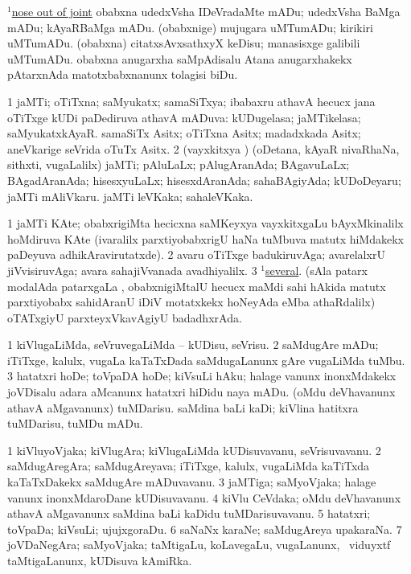 \noindent
\gl{\nuga}
\bmng
{} \hyperref{kandict_n.pdf}{N}{nose(1) pagu(21)}{$^1$nose out of joint} 
\banum
{} obabxna udedxVsha IDeVradaMte mADu; udedxVsha BaMga mADu; kAyaRBaMga mADu. 
 (obabxnige) mujugara uMTumADu; kirikiri uMTumADu. 
 (obabxna) citatxsAvxsathxyX keDisu; manasisxge galibili uMTumADu. 
 obabxna anugarxha saMpAdisalu Atana anugarxhakekx pAtarxnAda matotxbabxnanunx tolagisi biDu. 
\eanum
\emng
\eentry

\bentry
{}
\gl{\gu}
\bmng
\bnum
\num{1} jaMTi; oTiTxna; saMyukatx; samaSiTxya; ibabaxru athavA hecucx jana oTiTxge kUDi paDediruva athavA mADuva:   kUDugelasa; jaMTikelasa; saMyukatxkAyaR.   samaSiTx Asitx; oTiTxna Asitx; madadxkada Asitx; aneVkarige seVrida oTuTx Asitx. 
\num{2} (vayxkitxya \vi) (oDetana, kAyaR nivaRhaNa, sithxti, \mo vugaLalilx) jaMTi; pAluLaLx; pAlugAranAda; BAgavuLaLx; BAgadAranAda; hisesxyuLaLx; hisesxdAranAda; sahaBAgiyAda;   kUDoDeyaru; jaMTi mAliVkaru.   jaMTi leVKaka; sahaleVKaka. 
\enum
\emng

\noindent
\gl{\pagu}
\bmng
\bnum
\num{1}   jaMTi KAte; obabxrigiMta hecicxna saMKeyxya vayxkitxgaLu bAyxMkinalilx hoMdiruva KAte (ivaralilx parxtiyobabxrigU haNa tuMbuva matutx hiMdakekx paDeyuva adhikAravirutatxde). 
\num{2}    avaru oTiTxge badukiruvAga; avarelalxrU jiVvisiruvAga; avara sahajiVvanada avadhiyalilx. 
\num{3}  \hyperref{kandict_s.pdf}{S}{several(1) pagu(2)}{$^1$several}. (sAla patarx modalAda patarxgaLa \vi, obabxnigiMtalU hecucx maMdi sahi hAkida matutx parxtiyobabx sahidAranU iDiV motatxkekx hoNeyAda eMba athaRdalilx) oTATxgiyU parxteyxVkavAgiyU badadhxrAda. 
\enum
\emng
\eentry

\bentry
{}
\gl{\sakirx}
\bmng
\bnum
\num{1} kiVlugaLiMda, seVruvegaLiMda -- kUDisu, seVrisu. 
\num{2} saMdugAre mADu; iTiTxge, kalulx, \mo vugaLa kaTaTxDada saMdugaLanunx gAre \mo vugaLiMda tuMbu. 
\num{3} hatatxri hoDe; toVpaDA hoDe; kiVsuLi hAku; halage \mo vanunx inonxMdakekx joVDisalu adara aMcanunx hatatxri hiDidu naya mADu. 
 (oMdu deVhavanunx athavA aMgavanunx) 
\banum
{} tuMDarisu. 
 saMdina baLi kaDi; kiVlina hatitxra tuMDarisu, tuMDu mADu. 
\eanum
\numie
\enum
\emng
\eentry

\bentry
{}
\gl{\nA}
\bmng
\bnum
\num{1} kiVluyoVjaka; kiVlugAra; kiVlugaLiMda kUDisuvavanu, seVrisuvavanu. 
\num{2} saMdugAregAra; saMdugAreyava; iTiTxge, kalulx, \mo vugaLiMda kaTiTxda kaTaTxDakekx saMdugAre mADuvavanu. 
\num{3} jaMTiga; saMyoVjaka; halage \mo vanunx inonxMdaroDane kUDisuvavanu. 
\num{4} kiVlu CeVdaka; oMdu deVhavanunx athavA aMgavanunx saMdina baLi kaDidu tuMDarisuvavanu. 
\num{5} hatatxri; toVpaDa; kiVsuLi; ujujxgoraDu. 
\num{6} saNaNx karaNe; saMdugAreya upakaraNa. 
\num{7} joVDaNegAra; saMyoVjaka; taMtigaLu, koLavegaLu, \mo vugaLanunx, \kanmu\ viduyxtf taMtigaLanunx, kUDisuva kAmiRka. 
\enum
\emng
\eentry

